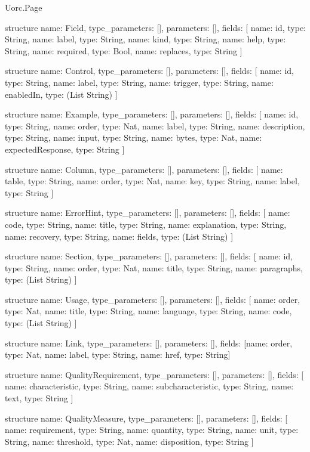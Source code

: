 \begin{lexlean}{Uorc.Page}
\begin{semanticmodule}
structure{
  name: Field,
  type_parameters: [],
  parameters: [],
  fields: [
    {name: id, type: String},
    {name: label, type: String},
    {name: kind, type: String},
    {name: help, type: String},
    {name: required, type: Bool},
    {name: replaces, type: String}
  ]
}

structure{
  name: Control,
  type_parameters: [],
  parameters: [],
  fields: [
    {name: id, type: String},
    {name: label, type: String},
    {name: trigger, type: String},
    {name: enabledIn, type: (List String)}
  ]
}

structure{
  name: Example,
  type_parameters: [],
  parameters: [],
  fields: [
    {name: id, type: String},
    {name: order, type: Nat},
    {name: label, type: String},
    {name: description, type: String},
    {name: input, type: String},
    {name: bytes, type: Nat},
    {name: expectedResponse, type: String}
  ]
}

structure{
  name: Column,
  type_parameters: [],
  parameters: [],
  fields: [
    {name: table, type: String},
    {name: order, type: Nat},
    {name: key, type: String},
    {name: label, type: String}
  ]
}

structure{
  name: ErrorHint,
  type_parameters: [],
  parameters: [],
  fields: [
    {name: code, type: String},
    {name: title, type: String},
    {name: explanation, type: String},
    {name: recovery, type: String},
    {name: fields, type: (List String)}
  ]
}

structure{
  name: Section,
  type_parameters: [],
  parameters: [],
  fields: [
    {name: id, type: String},
    {name: order, type: Nat},
    {name: title, type: String},
    {name: paragraphs, type: (List String)}
  ]
}

structure{
  name: Usage,
  type_parameters: [],
  parameters: [],
  fields: [
    {name: order, type: Nat},
    {name: title, type: String},
    {name: language, type: String},
    {name: code, type: (List String)}
  ]
}

structure{
  name: Link,
  type_parameters: [],
  parameters: [],
  fields: [{name: order, type: Nat}, {name: label, type: String}, {name: href, type: String}]
}

structure{
  name: QualityRequirement,
  type_parameters: [],
  parameters: [],
  fields: [
    {name: characteristic, type: String},
    {name: subcharacteristic, type: String},
    {name: text, type: String}
  ]
}

structure{
  name: QualityMeasure,
  type_parameters: [],
  parameters: [],
  fields: [
    {name: requirement, type: String},
    {name: quantity, type: String},
    {name: unit, type: String},
    {name: threshold, type: Nat},
    {name: disposition, type: String}
  ]
}


\end{semanticmodule}
\end{lexlean}
